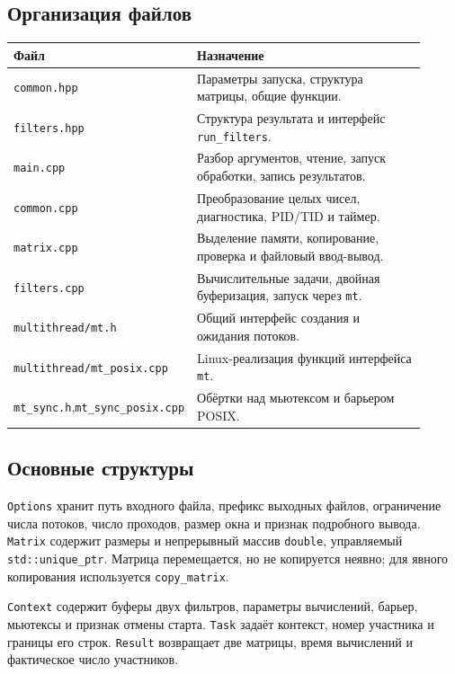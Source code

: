 \subsection{Организация файлов}
\begin{longtable}{|p{0.25\linewidth}|p{0.66\linewidth}|}
\hline
Файл & Назначение \\ \hline
\texttt{common.hpp} & Параметры запуска, структура матрицы, общие функции. \\ \hline
\texttt{filters.hpp} & Структура результата и интерфейс \texttt{run\_filters}. \\ \hline
\texttt{main.cpp} & Разбор аргументов, чтение, запуск обработки, запись результатов. \\ \hline
\texttt{common.cpp} & Преобразование целых чисел, диагностика, PID/TID и таймер. \\ \hline
\texttt{matrix.cpp} & Выделение памяти, копирование, проверка и файловый ввод-вывод. \\ \hline
\texttt{filters.cpp} & Вычислительные задачи, двойная буферизация, запуск через \texttt{mt}. \\ \hline
\texttt{multithread/mt.h} & Общий интерфейс создания и ожидания потоков. \\ \hline
\texttt{multithread/}\newline\texttt{mt\_posix.cpp} & Linux-реализация функций интерфейса \texttt{mt}. \\ \hline
\texttt{mt\_sync.h},\newline\texttt{mt\_sync\_posix.cpp} & Обёртки над мьютексом и барьером POSIX. \\ \hline
\end{longtable}

\subsection{Основные структуры}
\texttt{Options} хранит путь входного файла, префикс выходных файлов,
ограничение числа потоков, число проходов, размер окна и признак
подробного вывода. \texttt{Matrix} содержит размеры и непрерывный массив
\texttt{double}, управляемый \texttt{std::unique\_ptr}. Матрица перемещается,
но не копируется неявно; для явного копирования используется
\texttt{copy\_matrix}.

\texttt{Context} содержит буферы двух фильтров, параметры вычислений,
барьер, мьютексы и признак отмены старта. \texttt{Task} задаёт контекст,
номер участника и границы его строк. \texttt{Result} возвращает две
матрицы, время вычислений и фактическое число участников.

